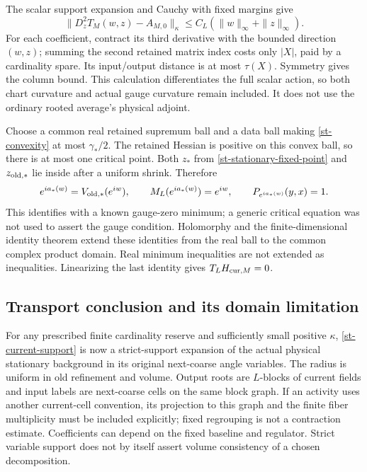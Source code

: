 \documentclass[11pt]{article}
\theoremstyle{remark}\newtheorem{remark}[theorem]{Remark}
\begin{document}
The scalar support expansion and Cauchy with fixed margins give
\begin{equation}
 \|D_z^2T_M(w,z)-A_{M,0}\|_\kappa
                \le C_L(\|w\|_\infty+\|z\|_\infty).         \label{st-convexity}
\end{equation}
For each coefficient, contract its third derivative with the bounded
direction $(w,z)$; summing the second retained matrix index costs only
$|X|$, paid by a cardinality spare. Its input/output distance is at
most $\tau(X)$. Symmetry gives the column bound. This calculation
differentiates the full scalar action, so both chart curvature and
actual gauge curvature remain included. It does not use the ordinary
rooted average's physical adjoint.

Choose a common real retained supremum ball and a data ball making
\eqref{st-convexity} at most $\gamma_*/2$. The retained Hessian is
positive on this convex ball, so there is at most one critical point.
Both $z_*$ from \eqref{st-stationary-fixed-point} and
$z_{{\rm old},*}$ lie inside after a uniform shrink. Therefore
\begin{equation}
 e^{ia_*(w)}=V_{{\rm old},*}(e^{iw}),\qquad
 M_L(e^{ia_*(w)})=e^{iw},\qquad P_{e^{ia_*(w)}}(y,x)=1.       \label{st-physical-identities}
\end{equation}
This identifies with a known gauge-zero minimum; a generic critical
equation was not used to assert the gauge condition. Holomorphy and the
finite-dimensional identity theorem extend these identities from the
real ball to the common complex product domain. Real minimum
inequalities are not extended as inequalities. Linearizing the last
identity gives $T_LH_{{\rm cur},M}=0$.

\subsection{Transport conclusion and its domain limitation}
\label{st-scope-section}

For any prescribed finite cardinality reserve and sufficiently small
positive $\kappa$, \eqref{st-current-support} is now a strict-support
expansion of the actual physical stationary background in its original
next-coarse angle variables. The radius is uniform in old refinement
and volume. Output roots are $L$-blocks of current fields and input
labels are next-coarse cells on the same block graph. If an activity
uses another current-cell convention, its projection to this graph and
the finite fiber multiplicity must be included explicitly; fixed
regrouping is not a contraction estimate. Coefficients can depend on
the fixed baseline and regulator. Strict variable support does not by
itself assert volume consistency of a chosen decomposition.
\end{document}
